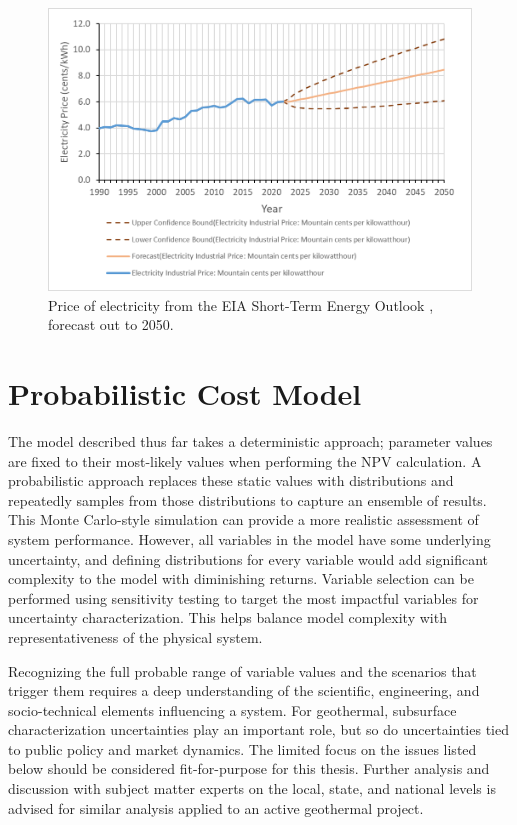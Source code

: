 \begin{figure}
\centering
\includegraphics[width=.8\textwidth]{templates/images/Figure-EIA_Electricity_Forecast.png}
\caption[Electricity price forecast]{Price of electricity from the EIA Short-Term Energy Outlook \protect\citep{eia_short-term_2021}, forecast out to 2050.}
\label{fig:electricity_pricing}
\end{figure}

\section{Probabilistic Cost Model}\label{ch4:cm_uncertainties}
The model described thus far takes a deterministic approach; parameter values are fixed to their most-likely values when performing the NPV calculation. A probabilistic approach replaces these static values with distributions and repeatedly samples from those distributions to capture an ensemble of results. This Monte Carlo-style simulation can provide a more realistic assessment of system performance. However, all variables in the model have some underlying uncertainty, and defining distributions for every variable would add significant complexity to the model with diminishing returns. Variable selection can be performed using sensitivity testing to target the most impactful variables for uncertainty characterization. This helps balance model complexity with representativeness of the physical system. 

Recognizing the full probable range of variable values and the scenarios that trigger them requires a deep understanding of the scientific, engineering, and socio-technical elements influencing a system. For geothermal, subsurface characterization uncertainties play an important role, but so do uncertainties tied to public policy and market dynamics. The limited focus on the issues listed below should be considered fit-for-purpose for this thesis. Further analysis and discussion with subject matter experts on the local, state, and national levels is advised for similar analysis applied to an active geothermal project.

